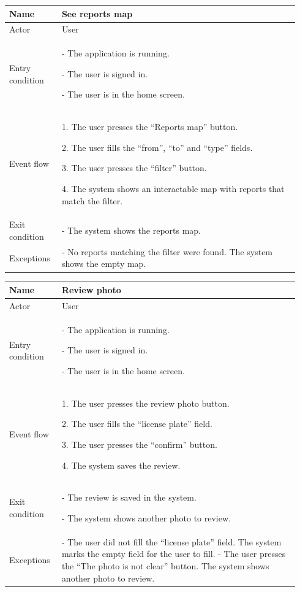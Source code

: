 \begin{table}[H]
\begin{tabular}{|p{0.17\linewidth}|p{0.77\linewidth}|}
\hline
Name            & See reports map
\\ \hline

Actor           & User
\\ \hline

Entry condition &
    - The application is running.

    - The user is signed in.

    - The user is in the home screen.
\\ \hline
Event flow      & 
    1. The user presses the “Reports map” button.

    2. The user fills the “from”, “to” and “type” fields.

    3. The user presses the “filter” button.

    4. The system shows an interactable map with reports that match the filter.
\\ \hline
Exit condition  & 
    - The system shows the reports map.
\\ \hline
Exceptions      &
    - No reports matching the filter were found. The system shows the empty map.
\\ \hline
\end{tabular}
\end{table}

\begin{table}[H]
\begin{tabular}{|p{0.17\linewidth}|p{0.77\linewidth}|}
\hline
Name            & Review photo
\\ \hline

Actor           & User
\\ \hline

Entry condition &
    - The application is running.

    - The user is signed in.

    - The user is in the home screen.
\\ \hline
Event flow      & 
    1. The user presses the review photo button.

    2. The user fills the “license plate” field.

    3. The user presses the “confirm” button.

    4. The system saves the review.
\\ \hline
Exit condition  & 
    - The review is saved in the system.

    - The system shows another photo to review.
\\ \hline
Exceptions      &
    - The user did not fill the “license plate” field. The system marks the empty field for the user to fill.
    - The user presses the “The photo is not clear” button. The system shows another photo to review.
\\ \hline
\end{tabular}
\end{table}

